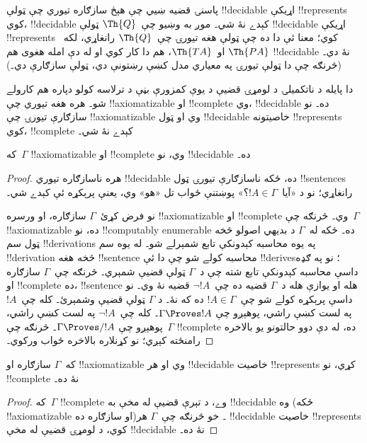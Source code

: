 \documentclass[../../../include/open-logic-section]{subfiles}
\begin{document}
\begin{explain}
پاسنۍ قضيه ښيي چې هېڅ سازګاره تيوري چې ټولې !!{decidable} اړيکې
!!{represents} کوي، !!{decidable} کېدے نۀ شي۔ موږ به وښيو چې~$\Th{Q}$
ټولې !!{decidable} اړيکې !!{represents} کوي؛ معنا ئې دا ده چې ټولې
هغه تيورۍ چې~$\Th{Q}$ رانغاړي، لکه~$\Th{PA}$ او~$\Th{TA}$، هم دا
کار کوي او له دې امله هغوى هم !!{decidable} نۀ دي۔ (څرنګه چې دا ټولې
تيورۍ په معياري مدل کښې رښتونې دي، ټولې سازګارې دي۔)

دا پايله د ناتکميلۍ د لومړۍ قضيې د يوې کمزورې بڼې د ترلاسه کولو
دپاره هم کارولے شو۔ هره هغه تيوري چې !!{axiomatizable} او
!!{complete} وي، !!{decidable} ده۔ نو سازګارې تيورۍ چې
!!{axiomatizable} وي او ټول !!{decidable} خاصيتونه !!{represents}
کوي، !!{complete} کېدے نۀ شي۔
\end{explain}

\begin{thm}
که~$\Gamma$ !!{axiomatizable} او !!{complete} وي، نو !!{decidable}
ده۔
\end{thm}

\begin{proof}
هره ناسازګاره تيوري !!{decidable} ده، ځکه ناسازګارې تيورۍ ټول
!!{sentence}s رانغاړي؛ نو د «آيا~$!A \in \Gamma$؟» پوښتنې ځواب تل
«هو» وي، يعنې پرېکړه ئې کېدے شي۔

نو فرض کړئ~$\Gamma$ سازګاره، او ورسره !!{axiomatizable} او
!!{complete} وي۔ څرنګه چې~$\Gamma$ !!{axiomatizable} ده، نو
!!{computably enumerable} ده۔ ځکه له~$\Gamma$ د بديهي اصولو څخه ټول
سم !!{derivation}s په يوه محاسبه کېدونکې تابع شمېرلے شو۔ له يوه سم
!!{derivation} څخه هغه !!{sentence} محاسبه کولے شو چې دا ئې
!!{derive}s؛ نو په ګډه داسې محاسبه کېدونکې تابع شته چې د~$\Gamma$ ټولې
قضيې شمېري۔ څرنګه چې~$\Gamma$ سازګاره او !!{complete} ده،
!!{sentence} هله او يوازې هله د~$\Gamma$ قضيه ده چې~$\lnot !A$
قضيه نۀ وي۔ نو داسې پرېکړه کولے شو چې~$!A \in \Gamma$ ده که نۀ۔ د
$\Gamma$ ټولې قضيې وشمېرئ۔ کله چې~$!A$ په لست کښې راشي، پوهېږو چې
$\Gamma \Proves !A$۔ کله چې~$\lnot !A$ په لست کښې راشي، پوهېږو چې
$\Gamma \Proves/ !A$۔ څرنګه چې~$\Gamma$ !!{complete} ده، له دې دوو
حالتونو يو بالاخره رامنځته کېږي؛ نو کړنلاره بالاخره ځواب ورکوي۔
\end{proof}

\begin{cor}
که~$\Gamma$ سازګاره او !!{axiomatizable} وي او هر !!{decidable}
خاصيت !!{represents} کړي، نو !!{complete} نۀ ده۔
\end{cor}

\begin{proof}
که~$\Gamma$ !!{complete} وے، د تېرې قضيې له مخې به !!{decidable} وه
(ځکه !!{axiomatizable} او سازګاره ده)۔ خو څرنګه چې~$\Gamma$ هر !!{decidable}
خاصيت !!{represents} کوي، د لومړۍ قضيې له مخې !!{decidable} نۀ ده۔
\end{proof}
\end{document}

